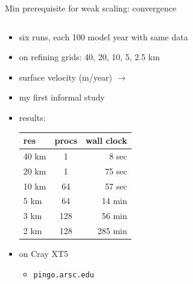 \documentclass[intlimits]{beamer}
\begin{document}
\begin{frame}{Min prerequisite for weak scaling: convergence}
\begin{columns}
\begin{column}{0.45\textwidth}
  \begin{itemize}\small
  \item six runs, each 100 model year with same data
  \item on refining grids: 40, 20, 10, 5, 2.5 km
  \item surface velocity (m/year) $\to$
  \item my first informal study
  \item results:
    \begin{tabular}{lcr}
    res & procs & wall clock \\ \hline
    40 km & 1 & 8 sec \\
    \color{red} 20 km & \color{red} 1 & \color{red} 75 sec \\
    \color{red} 10 km & \color{red} 64 & \color{red} 57 sec \\
    5 km & 64 & 14 min \\
    3 km & 128 & 56 min \\
    2 km & 128 & 285 min
    \end{tabular}
  \item on Cray XT5
    \begin{itemize}
    \item \texttt{pingo.arsc.edu}
    \end{itemize}
  \end{itemize}
  \normalsize
\end{column}
\begin{column}{0.55\textwidth}
  \vspace{-1cm}
  \begin{center}
  \end{center}
\end{column}
\end{columns}
\end{frame}
\end{document}
